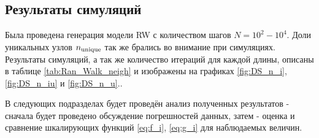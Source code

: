 \subsection{Результаты симуляций}

Была проведена генерация модели RW с количеством шагов $N = 10^{2}-10^{4}$. 
Доли уникальных узлов $n_{\textup{unique}}$ так же брались во внимание при симуляциях. 
Результаты симуляций, а так же количество итераций для каждой длины, описаны в таблице \ref{tab:Ran_Walk_neigh} и изображены на графиках \ref{fig:DS_n_i}, \ref{fig:DS_n_iu} и \ref{fig:DS_n_u}.\footnotemark{}.

В следующих подразделах будет проведён анализ полученных результатов - сначала будет проведено обсуждение погрешностей данных, затем - оценка и сравнение шкалирующих функций \eqref{eq:f_i}, \eqref{eq:g_i} для наблюдаемых величин.

